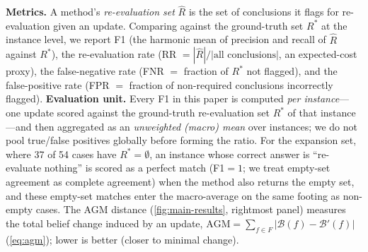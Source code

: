 \documentclass{article}
\theoremstyle{definition}
\begin{document}
\textbf{Metrics.}  A method's \emph{re-evaluation set} $\hat{R}$ is the
set of conclusions it flags for re-evaluation given an update.
Comparing against the ground-truth set $R^*$ at the instance level, we
report F1 (the harmonic mean of precision and recall of $\hat{R}$
against $R^*$), the re-evaluation rate (RR $= |\hat{R}| / |\text{all
conclusions}|$, an expected-cost proxy), the false-negative rate
(FNR $=$ fraction of $R^*$ not flagged), and the false-positive rate
(FPR $=$ fraction of non-required conclusions incorrectly flagged).
\textbf{Evaluation unit.}  Every F1 in this paper is computed
\emph{per instance}---one update scored against the ground-truth
re-evaluation set $R^*$ of that instance---and then aggregated as an
\emph{unweighted (macro) mean} over instances; we do not pool
true/false positives globally before forming the ratio.  For the
expansion set, where 37 of 54 cases have $R^*=\emptyset$, an instance
whose correct answer is ``re-evaluate nothing'' is scored as a perfect
match (F1$=1$; we treat empty-set agreement as complete agreement) when
the method also returns the empty set, and these
empty-set matches enter the macro-average on the same footing as
non-empty cases.  The AGM
distance (\cref{fig:main-results}, rightmost panel) measures the
total belief change induced by an update,
$\text{AGM} = \sum_{f\in F}|\mathcal{B}(f)-\mathcal{B}'(f)|$
(\cref{eq:agm}); lower is better (closer to minimal change).
\end{document}

